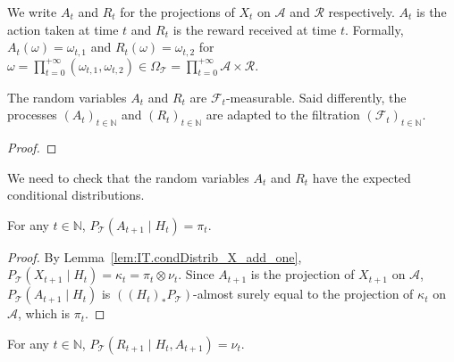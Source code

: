 \begin{definition}\label{def:IT.actionReward}
  \leanok
We write $A_t$ and $R_t$ for the projections of $X_t$ on $\mathcal{A}$ and $\mathcal{R}$ respectively.
$A_t$ is the action taken at time $t$ and $R_t$ is the reward received at time $t$.
Formally, $A_t(\omega) = \omega_{t,1}$ and $R_t(\omega) = \omega_{t,2}$ for $\omega = \prod_{t=0}^{+\infty}(\omega_{t,1}, \omega_{t,2}) \in \Omega_{\mathcal{T}} = \prod_{t=0}^{+\infty} \mathcal{A} \times \mathcal{R}$.
\end{definition}


\begin{lemma}\label{lem:IT.adapted_action_reward}
  \leanok
The random variables $A_t$ and $R_t$ are $\mathcal{F}_t$-measurable.
Said differently, the processes $(A_t)_{t \in \mathbb{N}}$ and $(R_t)_{t \in \mathbb{N}}$ are adapted to the filtration $(\mathcal{F}_t)_{t \in \mathbb{N}}$.
\end{lemma}

\begin{proof}\leanok

\end{proof}


We need to check that the random variables $A_t$ and $R_t$ have the expected conditional distributions.

\begin{lemma}\label{lem:IT.condDistrib_A_add_one}
  \leanok
For any $t \in \mathbb{N}$, $P_{\mathcal{T}}\left(A_{t+1} \mid H_t\right) = \pi_t$.
\end{lemma}

\begin{proof}\leanok
By Lemma~\ref{lem:IT.condDistrib_X_add_one}, $P_{\mathcal{T}}\left(X_{t+1} \mid H_t\right) = \kappa_t = \pi_t \otimes \nu_t$.
Since $A_{t+1}$ is the projection of $X_{t+1}$ on $\mathcal{A}$, $P_{\mathcal{T}}\left(A_{t+1} \mid H_t\right)$ is $((H_t)_* P_{\mathcal{T}})$-almost surely equal to the projection of $\kappa_t$ on $\mathcal{A}$, which is $\pi_t$.
\end{proof}


\begin{lemma}\label{lem:IT.condDistrib_R_add_one}
  \leanok
For any $t \in \mathbb{N}$, $P_{\mathcal{T}}\left(R_{t+1} \mid H_t, A_{t+1}\right) = \nu_t$.
\end{lemma}

